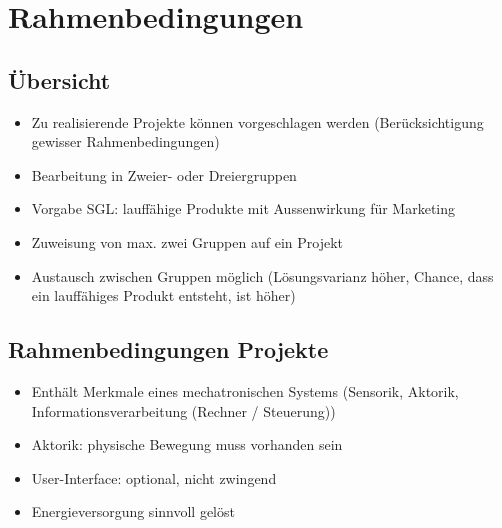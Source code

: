 \section*{Rahmenbedingungen}

\subsection*{Übersicht}
\begin{itemize}
    \item Zu realisierende Projekte können vorgeschlagen werden (Berücksichtigung gewisser Rahmenbedingungen)
    \item Bearbeitung in Zweier- oder Dreiergruppen
    \item Vorgabe SGL: lauffähige Produkte mit Aussenwirkung für Marketing
    \item Zuweisung von max. zwei Gruppen auf ein Projekt
    \item Austausch zwischen Gruppen möglich (Lösungsvarianz höher, Chance, dass ein lauffähiges Produkt entsteht, ist höher)
\end{itemize}
 

\subsection*{Rahmenbedingungen Projekte}
\begin{itemize}
    \item Enthält Merkmale eines mechatronischen Systems (Sensorik, Aktorik, Informationsverarbeitung (Rechner / Steuerung))
    \item Aktorik: physische Bewegung muss vorhanden sein
    \item User-Interface: optional, nicht zwingend
    \item Energieversorgung sinnvoll gelöst    
\end{itemize}

